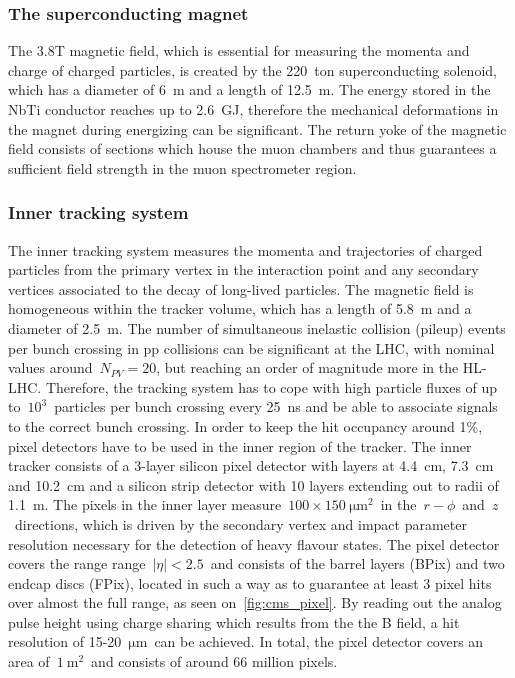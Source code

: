 \subsubsection{The superconducting magnet}

The 3.8T magnetic field, which is essential for measuring the momenta and charge of charged particles, is created by the 220~ton superconducting solenoid, which has a diameter of 6~m and a length of 12.5~m. The energy stored in the NbTi conductor reaches up to 2.6~GJ, therefore the mechanical deformations in the magnet during energizing can be significant. The return yoke of the magnetic field consists of sections which house the muon chambers and thus guarantees a sufficient field strength in the muon spectrometer region.

\subsubsection{Inner tracking system}
The inner tracking system measures the momenta and trajectories of charged particles from the primary vertex in the interaction point and any secondary vertices associated to the decay of long-lived particles. The magnetic field is homogeneous within the tracker volume, which has a length of 5.8~m and a diameter of 2.5~m. The number of simultaneous inelastic collision (pileup) events per bunch crossing in pp collisions can be significant at the LHC, with nominal values around~$N_{PV} = 20$, but reaching an order of magnitude more in the HL-LHC. Therefore, the tracking system has to cope with high particle fluxes of up to~$10^3$~particles per bunch crossing every 25~ns and be able to associate signals to the correct bunch crossing. In order to keep the hit occupancy around 1\%, pixel detectors have to be used in the inner region of the tracker. The inner tracker consists of a 3-layer silicon pixel detector with layers at 4.4~cm, 7.3~cm and 10.2~cm and a silicon strip detector with 10 layers extending out to radii of 1.1~m. The pixels in the inner layer measure~$100\times150~\mathrm{\mu m}^2$~in the~$r-\phi$~and~$z$~directions, which is driven by the secondary vertex and impact parameter resolution necessary for the detection of heavy flavour states. The pixel detector covers the range range~$|\eta| < 2.5$~and consists of the barrel layers (BPix) and two endcap discs (FPix), located in such a way as to guarantee at least 3 pixel hits over almost the full range, as seen on~\cref{fig:cms_pixel}. By reading out the analog pulse height using charge sharing which results from the the B field, a hit resolution of 15-20~$\mathrm{\mu m}$~can be achieved. In total, the pixel detector covers an area of~$1~\mathrm{m}^2$~and consists of around 66 million pixels.

